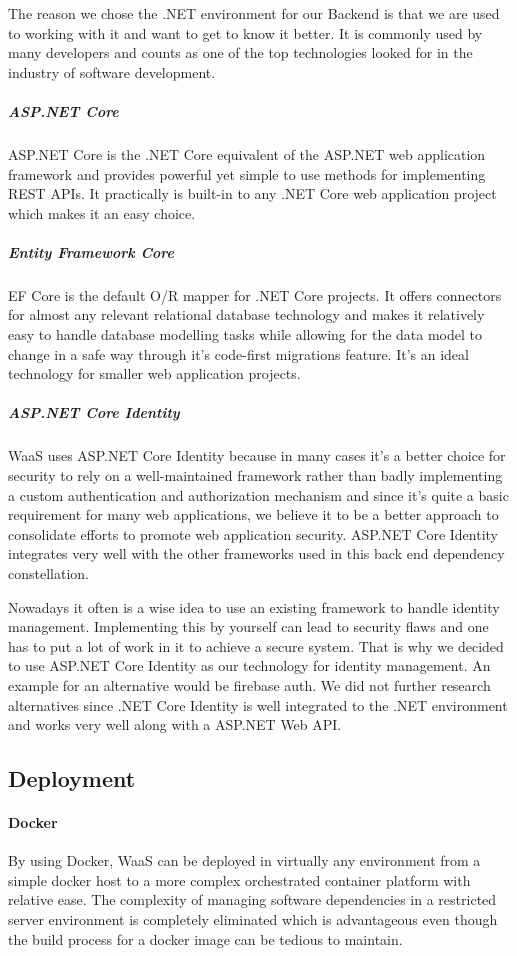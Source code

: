 \documentclass[titlepage, 12pt]{article}
\begin{document}
The reason we chose the .NET environment for our Backend is that we are used to working with it and want to get to know it better. It is commonly used by many developers and counts as one of the top technologies looked for in the industry of software development.

\subparagraph{ASP.NET Core}
ASP.NET Core is the .NET Core equivalent of the ASP.NET web application framework and provides powerful yet simple to use methods for implementing REST APIs. It practically is built-in to any
.NET Core web application project which makes it an easy choice.

\subparagraph{Entity Framework Core}
EF Core is the default O/R mapper for .NET Core projects. It offers connectors for almost any relevant relational database technology and makes it relatively easy to handle database modelling tasks
while allowing for the data model to change in a safe way through it's code-first migrations feature. It's an ideal technology for smaller web application projects.

\subparagraph{ASP.NET Core Identity}
WaaS uses ASP.NET Core Identity because in many cases it's a better choice for security to rely on a well-maintained framework rather than badly implementing a custom authentication and authorization mechanism and
since it's quite a basic requirement for many web applications, we believe it to be a better approach to consolidate efforts to promote web application security. ASP.NET Core Identity integrates very well with the other
frameworks used in this back end dependency constellation.

Nowadays it often is a wise idea to use an existing framework to handle identity management. Implementing this by yourself can lead to security flaws and one has to put a lot of work in it to achieve a secure system. That is why we decided to use ASP.NET Core Identity as our technology for identity management. An example for an alternative would be firebase auth. We did not further research alternatives since .NET Core Identity is well integrated to the .NET environment and works very well along with a ASP.NET Web API.

\subsection{Deployment}

\paragraph{Docker}
By using Docker, WaaS can be deployed in virtually any environment from a simple docker host to a more complex orchestrated container platform with relative ease.
The complexity of managing software dependencies in a restricted server environment is completely eliminated which is advantageous
even though the build process for a docker image can be tedious to maintain.
\end{document}
